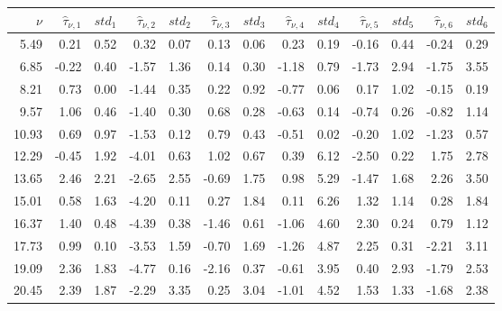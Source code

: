 \begin{tabular}{rrrrrrrrrrrrr}\hline 
 $\nu$ & $\widehat{\tau}_{\nu,1}$ & $std_1$ & $\widehat{\tau}_{\nu,2}$ & $std_2$ & $\widehat{\tau}_{\nu,3}$ & $std_3$ & $\widehat{\tau}_{\nu,4}$ & $std_4$ &  $\widehat{\tau}_{\nu,5}$ & $std_5$ & $\widehat{\tau}_{\nu,6}$ & $std_6$ \\ \hline 
    5.49 &     0.21 &     0.52 &     0.32 &     0.07  &     0.13 &     0.06 &     0.23 &     0.19 &    -0.16 &     0.44  &    -0.24 &     0.29  \\ 
    6.85 &    -0.22 &     0.40 &    -1.57 &     1.36  &     0.14 &     0.30 &    -1.18 &     0.79 &    -1.73 &     2.94  &    -1.75 &     3.55  \\ 
    8.21 &     0.73 &     0.00 &    -1.44 &     0.35  &     0.22 &     0.92 &    -0.77 &     0.06 &     0.17 &     1.02  &    -0.15 &     0.19  \\ 
    9.57 &     1.06 &     0.46 &    -1.40 &     0.30  &     0.68 &     0.28 &    -0.63 &     0.14 &    -0.74 &     0.26  &    -0.82 &     1.14  \\ 
   10.93 &     0.69 &     0.97 &    -1.53 &     0.12  &     0.79 &     0.43 &    -0.51 &     0.02 &    -0.20 &     1.02  &    -1.23 &     0.57  \\ 
   12.29 &    -0.45 &     1.92 &    -4.01 &     0.63  &     1.02 &     0.67 &     0.39 &     6.12 &    -2.50 &     0.22  &     1.75 &     2.78  \\ 
   13.65 &     2.46 &     2.21 &    -2.65 &     2.55  &    -0.69 &     1.75 &     0.98 &     5.29 &    -1.47 &     1.68  &     2.26 &     3.50  \\ 
   15.01 &     0.58 &     1.63 &    -4.20 &     0.11  &     0.27 &     1.84 &     0.11 &     6.26 &     1.32 &     1.14  &     0.28 &     1.84  \\ 
   16.37 &     1.40 &     0.48 &    -4.39 &     0.38  &    -1.46 &     0.61 &    -1.06 &     4.60 &     2.30 &     0.24  &     0.79 &     1.12  \\ 
   17.73 &     0.99 &     0.10 &    -3.53 &     1.59  &    -0.70 &     1.69 &    -1.26 &     4.87 &     2.25 &     0.31  &    -2.21 &     3.11  \\ 
   19.09 &     2.36 &     1.83 &    -4.77 &     0.16  &    -2.16 &     0.37 &    -0.61 &     3.95 &     0.40 &     2.93  &    -1.79 &     2.53  \\ 
   20.45 &     2.39 &     1.87 &    -2.29 &     3.35  &     0.25 &     3.04 &    -1.01 &     4.52 &     1.53 &     1.33  &    -1.68 &     2.38  \\ 

\end{tabular}
